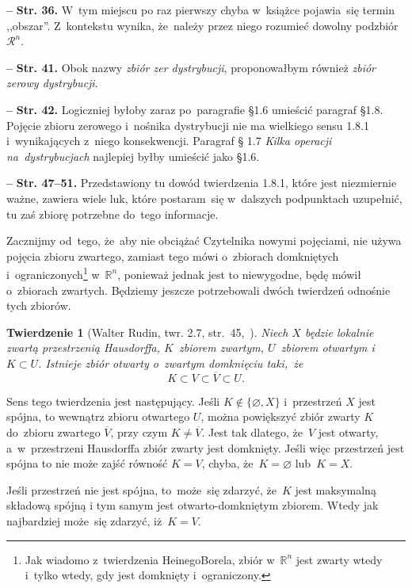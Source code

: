 \documentclass[a4paper,11pt]{article}
\newtheorem{twr}{Twierdzenie}
\let\emptyset\varnothing
\newcommand{\ol}{\overline}
\newcommand{\mb}{\mathbb}
\newcommand{\mc}{\mathcal}
\newcommand{\wtw}{wtedy i~tylko wtedy}
\newcommand{\R}{\mb{R}}
\newcommand{\Rn}{\R^{ n }}
\newcommand{\Rc}{\mc{R}}
\newcommand{\es}{\emptyset}
\newcommand{\subs}{\subset}
\newcommand{\tb}{\textbf}
\newcommand{\noi}{\noindent}
\newcommand{\start}{\noi \tb{--} {}}
\newcommand{\Str}[1]{\tb{Str. #1.}}
\newcommand{\Rnc}{\Rc^{ n }}
\begin{document}
\start \Str{36} W~tym miejscu po raz pierwszy chyba w~książce
pojawia~się termin ,,obszar''. Z~kontekstu wynika, że~należy przez
niego rozumieć dowolny podzbiór $\Rnc$.

\start \Str{41} Obok nazwy \emph{zbiór zer dystrybucji}, proponowałbym
również \emph{zbiór zerowy dystrybucji}.

\start \Str{42} Logiczniej byłoby zaraz po~paragrafie \S 1.6 umieścić
paragraf \S 1.8. Pojęcie zbioru zerowego i~nośnika dystrybucji nie ma
wielkiego sensu 1.8.1 i~wynikających z~niego konsekwencji. Paragraf \S
1.7 \emph{Kilka operacji na~dystrybucjach} najlepiej byłby umieścić
jako \S 1.6.

\start \Str{47--51} Przedstawiony tu dowód twierdzenia 1.8.1, które
jest niezmiernie ważne, zawiera wiele luk, które postaram~się
w~dalszych podpunktach uzupełnić, tu zaś zbiorę potrzebne do~tego
informacje.

Zacznijmy od~tego, że~aby nie obciążać Czytelnika nowymi pojęciami,
nie używa pojęcia zbioru zwartego, zamiast tego mówi o~zbiorach
domkniętych i~ograniczonych\footnote{Jak wiadomo z~twierdzenia
  Heinego\dywiz Borela, zbiór w~$\Rn$ jest zwarty \wtw, gdy jest
  domknięty i~ograniczony.} w~$\Rn$, ponieważ jednak jest to
niewygodne, będę mówił o~zbiorach zwartych. Będziemy jeszcze
potrzebowali dwóch twierdzeń odnośnie tych zbiorów.

\begin{twr}[Walter Rudin, twr. 2.7, str.~45,~\cite{Rud98}]
  \label{twr:Zem-s01-01}
  Niech $X$ będzie lokalnie zwartą przestrzenią Hausdorffa,
  $K$~zbiorem zwartym, $U$~zbiorem otwartym i~$K \subs U$. Istnieje
  zbiór otwarty o~zwartym domknięciu taki,~że
  \begin{equation}
    \label{eq:Zem-s01-04}
    K \subs V \subs \ol{ V } \subs U.
  \end{equation}
\end{twr}
Sens tego twierdzenia jest następujący. Jeśli $K \notin \{ \es, X \}$
i~przestrzeń $X$ jest spójna, to wewnątrz zbioru otwartego $U$, można
powiększyć zbiór zwarty $K$ do~zbioru zwartego $\ol{ V }$, przy czym
$K \neq \ol{ V }$. Jest tak dlatego, że~$V$ jest otwarty,
a~w~przestrzeni Hausdorffa zbiór zwarty jest domknięty. Jeśli więc
przestrzeń jest spójna to nie może zajść równość $K = V$, chyba,
że~$K = \es$ lub~$K = X$.

Jeśli przestrzeń nie jest spójna, to~może~się zdarzyć, że~$K$ jest
maksymalną składową spójną i tym samym jest otwarto-domkniętym
zbiorem. Wtedy jak najbardziej może~się zdarzyć, iż~$K = V$.
\end{document}
